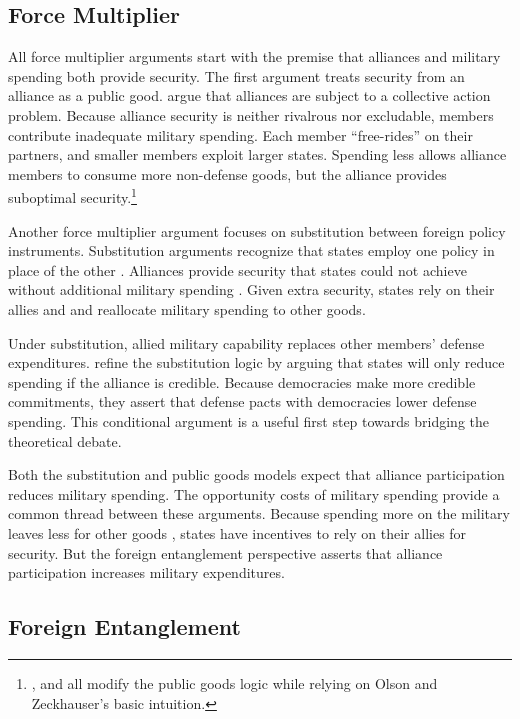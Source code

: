 \documentclass[12pt]{article}
\begin{document}
\subsection{Force Multiplier} 


All force multiplier arguments start with the premise that alliances and military spending both provide security.
The first argument treats security from an alliance as a public good. 
\citet{OlsonZeckhauser1966} argue that alliances are subject to a collective action problem.
Because alliance security is neither rivalrous nor excludable, members contribute inadequate military spending. 
Each member ``free-rides'' on their partners, and smaller members exploit larger states. 
Spending less allows alliance members to consume more non-defense goods, but the alliance provides suboptimal security.\footnote{\citet{SandlerForbes1980}, \citet{Oneal1990} and \citet{SandlerHartley2001} all modify the public goods logic while relying on Olson and Zeckhauser's basic intuition.} 


Another force multiplier argument focuses on substitution between foreign policy instruments.
Substitution arguments recognize that states employ one policy in place of the other \citep{MostStarr1989}.  
Alliances provide security that states could not achieve without additional military spending \citep{Morrow1993, Conybeare1994}. 
Given extra security, states rely on their allies and and reallocate military spending to other goods. 


Under substitution, allied military capability replaces other members' defense expenditures. 
\citet{DigiuseppePoast2016} refine the substitution logic by arguing that states will only reduce spending if the alliance is credible. 
Because democracies make more credible commitments, they assert that defense pacts with democracies lower defense spending.
This conditional argument is a useful first step towards bridging the theoretical debate. 


Both the substitution and public goods models expect that alliance participation reduces military spending. 
The opportunity costs of military spending provide a common thread between these arguments. 
Because spending more on the military leaves less for other goods \citep{Fordham1998}, states have incentives to rely on their allies for security. 
But the foreign entanglement perspective asserts that alliance participation increases military expenditures. 


\subsection{Foreign Entanglement}
\end{document}
